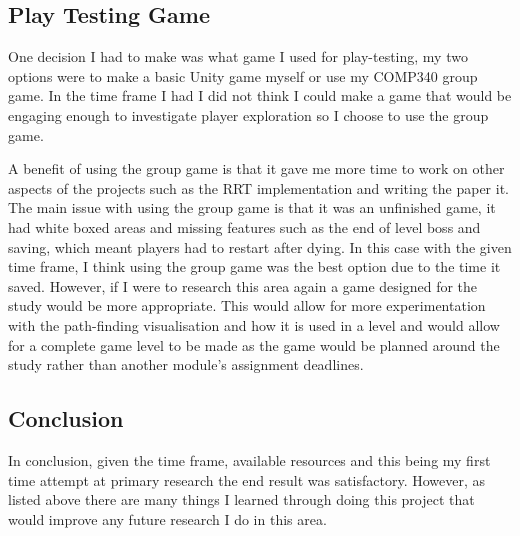 \documentclass[journal]{IEEEtran}
\begin{document}
	
	\subsection{Play Testing Game}
	One decision I had to make was what game I used for play-testing, my two options were to make a basic Unity game myself or use my COMP340 group game. In the time frame I had I did not think I could make a game that would be engaging enough to investigate player exploration so I choose to use the group game. 
	
	A benefit of using the group game is that it gave me more time to work on other aspects of the projects such as the RRT implementation and writing the paper it. 
	The main issue with using the group game is that it was an unfinished game, it had white boxed areas and missing features such as the end of level boss and saving, which meant players had to restart after dying.
	In this case with the given time frame, I think using the group game was the best option due to the time it saved. However, if I were to research this area again a game designed for the study would be more appropriate. This would allow for more experimentation with the path-finding visualisation and how it is used in a level and would allow for a complete game level to be made as the game would be planned around the study rather than another module's assignment deadlines.
	
	
	\subsection{Conclusion}
	In conclusion, given the time frame, available resources and this being my first time attempt at primary research the end result was satisfactory. However, as listed above there are many things I learned through doing this project that would improve any future research I do in this area.
\end{document}
